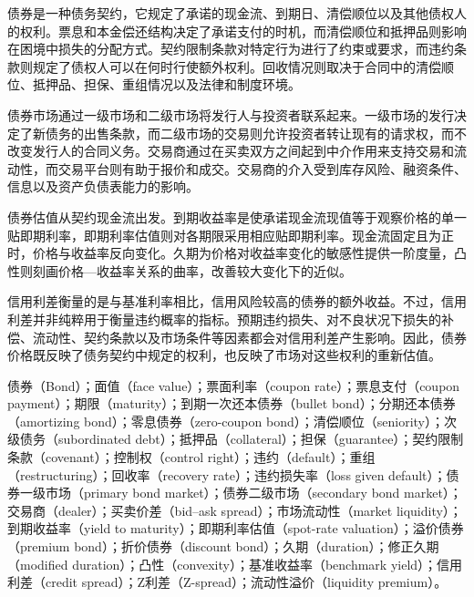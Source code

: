 

债券是一种债务契约，它规定了承诺的现金流、到期日、清偿顺位以及其他债权人的权利。票息和本金偿还结构决定了承诺支付的时机，而清偿顺位和抵押品则影响在困境中损失的分配方式。契约限制条款对特定行为进行了约束或要求，而违约条款则规定了债权人可以在何时行使额外权利。回收情况则取决于合同中的清偿顺位、抵押品、担保、重组情况以及法律和制度环境。

债券市场通过一级市场和二级市场将发行人与投资者联系起来。一级市场的发行决定了新债务的出售条款，而二级市场的交易则允许投资者转让现有的请求权，而不改变发行人的合同义务。交易商通过在买卖双方之间起到中介作用来支持交易和流动性，而交易平台则有助于报价和成交。交易商的介入受到库存风险、融资条件、信息以及资产负债表能力的影响。

债券估值从契约现金流出发。到期收益率是使承诺现金流现值等于观察价格的单一贴即期利率，即期利率估值则对各期限采用相应贴即期利率。现金流固定且为正时，价格与收益率反向变化。久期为价格对收益率变化的敏感性提供一阶度量，凸性则刻画价格—收益率关系的曲率，改善较大变化下的近似。

信用利差衡量的是与基准利率相比，信用风险较高的债券的额外收益。不过，信用利差并非纯粹用于衡量违约概率的指标。预期违约损失、对不良状况下损失的补偿、流动性、契约条款以及市场条件等因素都会对信用利差产生影响。因此，债券价格既反映了债务契约中规定的权利，也反映了市场对这些权利的重新估值。



债券（Bond）；面值（face value）；票面利率（coupon rate）；票息支付（coupon payment）；期限（maturity）；到期一次还本债券（bullet bond）；分期还本债券（amortizing bond）；零息债券（zero-coupon bond）；清偿顺位（seniority）；次级债务（subordinated debt）；抵押品（collateral）；担保（guarantee）；契约限制条款（covenant）；控制权（control right）；违约（default）；重组（restructuring）；回收率（recovery rate）；违约损失率（loss given default）；债券一级市场（primary bond market）；债券二级市场（secondary bond market）；交易商（dealer）；买卖价差（bid--ask spread）；市场流动性（market liquidity）；到期收益率（yield to maturity）；即期利率估值（spot-rate valuation）；溢价债券（premium bond）；折价债券（discount bond）；久期（duration）；修正久期（modified duration）；凸性（convexity）；基准收益率（benchmark yield）；信用利差（credit spread）；Z利差（Z-spread）；流动性溢价（liquidity premium）。

